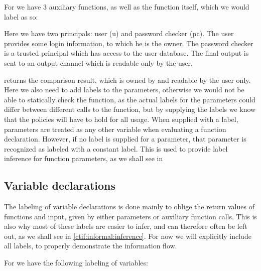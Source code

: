 For  we have 3 auxiliary functions, as well as the  function itself, which we would label as so:\\
\begin{minipage}{\linewidth}

\end{minipage}

Here we have two principals: user (u) and password checker (pc).
The user provides some login information, to which he is the owner.
The password checker is a trusted principal which has access to the user database.
The final output is sent to an output channel which is readable only by the user.

 returns the comparison result, which is owned by and readable by the user only.
Here we also need to add labels to the parameters, otherwise we would not be able to statically check the function, as the actual labels for the parameters could differ between different calls to the function, but by supplying the labels we know that the policies will have to hold for all usage.
When supplied with a label, parameters are treated as any other variable when evaluating a function declaration.
However, if no label is supplied for a parameter, that parameter is recognized as labeled with a constant label.
This is used to provide label inference for function parameters, as we shall see in

\subsection{Variable declarations}
The labeling of variable declarations is done mainly to oblige the return values of functions and input, given by either parameters or auxiliary function calls.
This is also why most of these labels are easier to infer, and can therefore often be left out, as we shall see in \cref{ctif:informal:inference}.
For now we will explicitly include all labels, to properly demonstrate the information flow.

For  we have the following labeling of variables:\\
\begin{minipage}{\linewidth}

\end{minipage}

